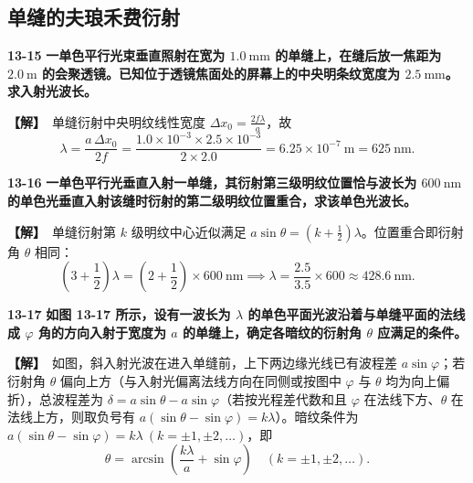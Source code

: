 \documentclass[zihao=5,a4paper,UTF8]{ctexart}
\newenvironment{prob}[2]{%
    \par\vspace{6pt}\noindent\textbf{\color{navy}#1} \textbf{#2}\par\nopagebreak\vspace{2pt}%
}{%
    \par\vspace{4pt}%
}
\newcommand{\sol}{\noindent\textbf{\color{tealaccent}【解】}\ }
\begin{document}
\subsection{单缝的夫琅禾费衍射}

\begin{prob}{13-15}{一单色平行光束垂直照射在宽为 $1.0\ \mathrm{mm}$ 的单缝上，在缝后放一焦距为 $2.0\ \mathrm{m}$ 的会聚透镜。已知位于透镜焦面处的屏幕上的中央明条纹宽度为 $2.5\ \mathrm{mm}$。求入射光波长。}
\sol 单缝衍射中央明纹线性宽度 $\Delta x_0 = \frac{2f\lambda}{a}$，故
\[
    \lambda = \frac{a\,\Delta x_0}{2f} = \frac{1.0\times 10^{-3}\times 2.5\times 10^{-3}}{2\times 2.0} = 6.25\times 10^{-7}\ \mathrm{m} = 625\ \mathrm{nm}.
\]
\end{prob}

\begin{prob}{13-16}{一单色平行光垂直入射一单缝，其衍射第三级明纹位置恰与波长为 $600\ \mathrm{nm}$ 的单色光垂直入射该缝时衍射的第二级明纹位置重合，求该单色光波长。}
\sol 单缝衍射第 $k$ 级明纹中心近似满足 $a\sin\theta = \left(k + \frac{1}{2}\right)\lambda$。位置重合即衍射角 $\theta$ 相同：
\[
    \left(3 + \frac{1}{2}\right)\lambda = \left(2 + \frac{1}{2}\right)\times 600\ \mathrm{nm} \implies \lambda = \frac{2.5}{3.5}\times 600 \approx 428.6\ \mathrm{nm}.
\]
\end{prob}

\begin{prob}{13-17}{如图 13-17 所示，设有一波长为 $\lambda$ 的单色平面光波沿着与单缝平面的法线成 $\varphi$ 角的方向入射于宽度为 $a$ 的单缝上，确定各暗纹的衍射角 $\theta$ 应满足的条件。}
\sol 如图，斜入射光波在进入单缝前，上下两边缘光线已有波程差 $a\sin\varphi$；若衍射角 $\theta$ 偏向上方（与入射光偏离法线方向在同侧或按图中 $\varphi$ 与 $\theta$ 均为向上偏折），总波程差为 $\delta = a\sin\theta - a\sin\varphi$（若按光程差代数和且 $\varphi$ 在法线下方、$\theta$ 在法线上方，则取负号有 $a(\sin\theta - \sin\varphi) = k\lambda$）。暗纹条件为 $a(\sin\theta - \sin\varphi) = k\lambda\ (k=\pm 1,\pm 2,\dots)$，即
\[
    \theta = \arcsin\left(\frac{k\lambda}{a} + \sin\varphi\right)\quad (k = \pm 1, \pm 2, \dots).
\]
\end{prob}
\end{document}
